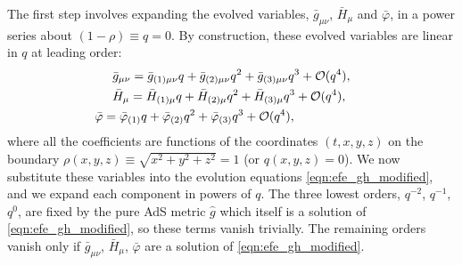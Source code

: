 \documentclass[aps,letterpaper,twocolumn,nofootinbib]{revtex4}
\numberwithin{equation}{section}
\begin{document}
The first step involves expanding the evolved variables, $\bar{g}_{\mu \nu}$, $\bar{H}_{\mu}$ and $\bar{\varphi}$, in a power series about $(1-\rho) \equiv q = 0$. 
By construction, these evolved variables are linear in $q$ at leading order:
\begin{eqnarray}\label{eqn:qexp}
&\bar{g}_{\mu \nu} = \bar{g}_{(1) \mu \nu} q + \bar{g}_{(2) \mu \nu} q^2 + \bar{g}_{(3) \mu \nu} q^3 + \mathcal{O}(q^4), \label{eqn:qexpg} \\
&\bar{H}_{\mu} = \bar{H}_{(1) \mu} q + \bar{H}_{(2) \mu} q^2 + \bar{H}_{(3) \mu} q^3 + \mathcal{O}(q^4) ,\label{eqn:qexpH}\\
&\hspace{-0.5cm}\bar{\varphi} = \bar{\varphi}_{(1)} q + \bar{\varphi}_{(2)} q^2 + \bar{\varphi}_{(3)} q^3 + \mathcal{O}(q^4), \label{eqn:qexpphi}
\end{eqnarray}
where all the coefficients are functions of the coordinates $(t,x,y,z)$ on the boundary $\rho(x,y,z)\equiv\sqrt{x^2+y^2+z^2}=1$ (or $q(x,y,z)=0$).
We now substitute these variables into the evolution equations \eqref{eqn:efe_gh_modified}, and we expand each component in powers of $q$. The three lowest orders, $q^{-2}$, $q^{-1}$, $q^0$, are fixed by the pure AdS metric $\hat{g}$ which itself is a solution of \eqref{eqn:efe_gh_modified}, so these terms vanish trivially. The remaining orders vanish only if $\bar{g}_{\mu \nu}$, $\bar{H}_{\mu}$, $\bar{\varphi}$ are a solution of \eqref{eqn:efe_gh_modified}.
\end{document}
